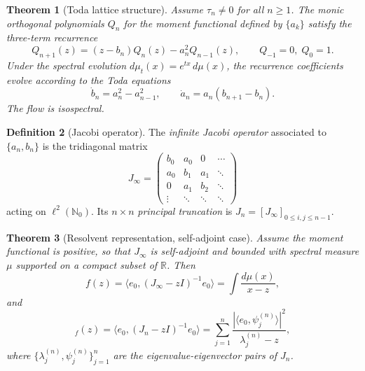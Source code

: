 \documentclass[11pt]{article}
\newtheorem{theorem}{Theorem}[section]
\theoremstyle{definition}
\newtheorem{definition}[theorem]{Definition}
\theoremstyle{remark}
\begin{document}
\begin{theorem}[Toda lattice structure]
\label{thm:toda}
Assume $\tau_{n}\ne 0$ for all $n\ge 1$. The monic orthogonal polynomials $Q_{n}$ for the moment functional defined by $\{a_{k}\}$ satisfy the three-term recurrence
\begin{equation}
Q_{n+1}(z)=(z-b_{n})Q_{n}(z)-a_{n}^{2}Q_{n-1}(z),
\qquad Q_{-1}=0,\;Q_{0}=1.
\label{eq:three-term}
\end{equation}
Under the spectral evolution $d\mu_{t}(x)=e^{tx}\,d\mu(x)$, the recurrence coefficients evolve according to the Toda equations
\begin{equation}
\dot{b}_{n}=a_{n}^{2}-a_{n-1}^{2},
\qquad
\dot{a}_{n}=a_{n}(b_{n+1}-b_{n}).
\label{eq:toda}
\end{equation}
The flow is isospectral.
\end{theorem}

\begin{definition}[Jacobi operator]
\label{def:jacobi}
The \emph{infinite Jacobi operator} associated to $\{a_{n},b_{n}\}$ is the tridiagonal matrix
\begin{equation}
J_{\infty}=
\begin{pmatrix}
b_{0} & a_{0} & 0 & \cdots\\
a_{0} & b_{1} & a_{1} & \ddots\\
0 & a_{1} & b_{2} & \ddots\\
\vdots & \ddots & \ddots & \ddots
\end{pmatrix}
\label{eq:jacobi-matrix}
\end{equation}
acting on $\ell^{2}(\mathbb{N}_{0})$. Its $n\times n$ \emph{principal truncation} is $J_{n}=[J_{\infty}]_{0\le i,j\le n-1}$.
\end{definition}

\begin{theorem}[Resolvent representation, self-adjoint case]
\label{thm:resolvent-representation}
Assume the moment functional is positive, so that $J_{\infty}$ is self-adjoint and bounded with spectral measure $\mu$ supported on a compact subset of $\mathbb{R}$. Then
\begin{equation}
f(z)=\langle e_{0},(J_{\infty}-zI)^{-1}e_{0}\rangle
=\int\frac{d\mu(x)}{x-z},
\label{eq:resolvent}
\end{equation}
and
\begin{equation}
[n/n]_{f}(z)=\langle e_{0},(J_{n}-zI)^{-1}e_{0}\rangle
=\sum_{j=1}^{n}\frac{|\langle e_{0},\psi_{j}^{(n)}\rangle|^{2}}{\lambda_{j}^{(n)}-z},
\label{eq:truncated-resolvent}
\end{equation}
where $\{\lambda_{j}^{(n)},\psi_{j}^{(n)}\}_{j=1}^{n}$ are the eigenvalue-eigenvector pairs of $J_{n}$.
\end{theorem}
\end{document}
